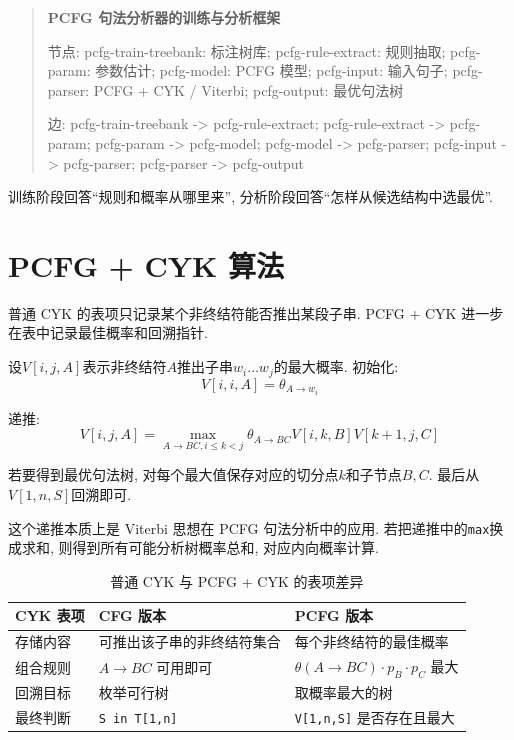 \begin{quote}
\small
\textbf{PCFG 句法分析器的训练与分析框架}
\par 节点: pcfg-train-treebank: 标注树库; pcfg-rule-extract: 规则抽取; pcfg-param: 参数估计; pcfg-model: PCFG 模型; pcfg-input: 输入句子; pcfg-parser: PCFG + CYK / Viterbi; pcfg-output: 最优句法树
\par 边: pcfg-train-treebank -\textgreater{} pcfg-rule-extract; pcfg-rule-extract -\textgreater{} pcfg-param; pcfg-param -\textgreater{} pcfg-model; pcfg-model -\textgreater{} pcfg-parser; pcfg-input -\textgreater{} pcfg-parser; pcfg-parser -\textgreater{} pcfg-output
\end{quote}

训练阶段回答“规则和概率从哪里来”, 分析阶段回答“怎样从候选结构中选最优”.

\section{PCFG + CYK 算法}


普通 CYK 的表项只记录某个非终结符能否推出某段子串.
PCFG + CYK 进一步在表中记录最佳概率和回溯指针.

设$V[i,j,A]$表示非终结符$A$推出子串$w_i \dots w_j$的最大概率.
初始化:
\[
V[i,i,A] = \theta_{A \to w_i}
\]

递推:
\[
V[i,j,A]
  =
  \max_{A \to B C, i \le k < j}
  \theta_{A \to B C} V[i,k,B] V[k+1,j,C]
\]

若要得到最优句法树, 对每个最大值保存对应的切分点$k$和子节点$B,C$.
最后从$V[1,n,S]$回溯即可.

这个递推本质上是 Viterbi 思想在 PCFG 句法分析中的应用.
若把递推中的\texttt{max}换成求和, 则得到所有可能分析树概率总和, 对应内向概率计算.

\begin{table}[H]
\centering
\begingroup
\setlength{\tabcolsep}{2pt}
\small
\caption{普通 CYK 与 PCFG + CYK 的表项差异}
\begin{tabular}{|p{}|p{}|p{}|}
\hline
CYK 表项 & CFG 版本 & PCFG 版本 \\ \hline
存储内容 & 可推出该子串的非终结符集合 & 每个非终结符的最佳概率 \\ \hline
组合规则 & $A \to B C$ 可用即可 & $\theta(A \to B C) \cdot p_B \cdot p_C$ 最大 \\ \hline
回溯目标 & 枚举可行树 & 取概率最大的树 \\ \hline
最终判断 & \texttt{S in T[1,n]} & \texttt{V[1,n,S]} 是否存在且最大 \\ \hline
\end{tabular}
\endgroup
\end{table}

